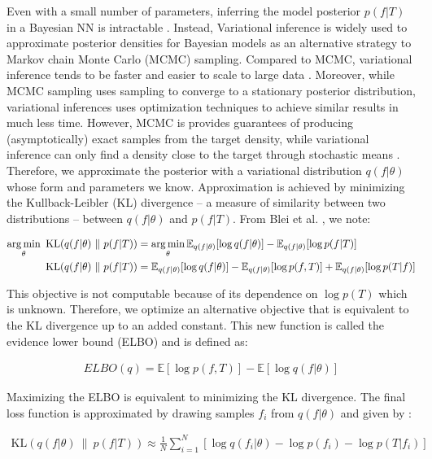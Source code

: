 Even with a small number of parameters, inferring the model posterior $p(f|T)$ in a Bayesian NN is intractable \cite{gal2016bayesian}. Instead, Variational inference is widely used to approximate posterior densities for Bayesian models as an alternative strategy to Markov chain Monte Carlo (MCMC) sampling. Compared to MCMC, variational inference tends to be faster and easier to scale to large data \cite{Blei_2017}. Moreover, while MCMC sampling uses sampling to converge to a stationary posterior distribution, variational inferences uses optimization techniques to achieve similar results in much less time. However, MCMC is provides guarantees of producing (asymptotically) exact samples from the target density, while variational inference can only find a density close to the target through stochastic means \cite{robert_casella_2004}. Therefore, we approximate the posterior with a variational distribution $q(f|\theta)$ whose form and parameters we know. Approximation is achieved by minimizing the Kullback-Leibler (KL) divergence – a measure of similarity between two distributions – between $q(f|\theta)$ and $p(f|T)$. From Blei et al. \cite{Blei_2017}, we note: 

\begin{align}
    \operatorname*{arg\,min}_{\theta} \ \mathrm{KL}(q(f | \theta) \ \| \ p(f | T)) &= \operatorname*{arg\,min}_{\theta} \mathbb{E}_{q(f|\theta)}[\log q(f|\theta)] - \mathbb{E}_{q(f|\theta)}[\log p(f|T)] \\
    \mathrm{KL}(q(f | \theta) \ \| \ p(f | T)) &= \mathbb{E}_{q(f|\theta)}[\log q(f|\theta)] - \mathbb{E}_{q(f|\theta)}[\log p(f, T)] + \mathbb{E}_{q(f|\theta)} [\log p(T|f)]
\end{align}

This objective is not computable because of its dependence on $\log p(T)$ which is unknown. Therefore, we optimize an alternative objective that is equivalent to the KL divergence up to an added constant. This new function is called the evidence lower bound (ELBO) and is defined as:

\begin{align}
    ELBO(q) = \mathbb{E}[\log p(f, T)] - \mathbb{E}[\log q(f|\theta)]
\end{align}

Maximizing the ELBO is equivalent to minimizing the KL divergence. The final loss function is approximated by drawing samples $f_i$ from $q(f|\theta)$ and given by \cite{krasser2019}:

\begin{align}
    \mathrm{KL}(q(f | \theta) \ \| \ p(f | T)) \approx \frac{1}{N} \sum_{i=1}^{N} [\log q(f_i|\theta) - \log p(f_i) - \log p(T|f_i)]
\end{align}

